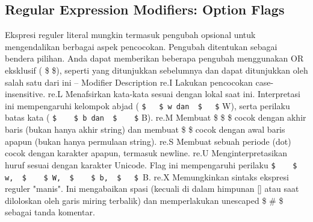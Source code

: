 \begin{enumerate}
\begin{enumerate}
\subsection{Regular Expression Modifiers: Option Flags}
Ekspresi reguler literal mungkin termasuk pengubah opsional untuk mengendalikan berbagai aspek pencocokan. Pengubah ditentukan sebagai bendera pilihan. Anda dapat memberikan beberapa pengubah menggunakan OR eksklusif ( \$   \$), seperti yang ditunjukkan sebelumnya dan dapat ditunjukkan oleh salah satu dari ini – Modifier Description
re.I
Lakukan pencocokan case-insensitive.
re.L
Menafsirkan kata-kata sesuai dengan lokal saat ini. Interpretasi ini mempengaruhi kelompok abjad ( \verb|$   $ w dan  $   $| W), serta perilaku batas kata ( \verb|$    $ b dan  $    $| B).
re.M
Membuat  \$  \$  \$ cocok dengan akhir baris (bukan hanya akhir string) dan membuat  \$   \$ cocok dengan awal baris apapun (bukan hanya permulaan string).
re.S
Membuat sebuah periode (dot) cocok dengan karakter apapun, termasuk newline.
re.U
Menginterpretasikan huruf sesuai dengan karakter Unicode. Flag ini mempengaruhi perilaku  \verb|$    $ w,  $    $ W,  $    $ b,  $   $ |B.
re.X
Memungkinkan sintaks ekspresi reguler "manis". Ini mengabaikan spasi (kecuali di dalam himpunan [] atau saat diloloskan oleh garis miring terbalik) dan memperlakukan unescaped  \$  \#  \$ sebagai tanda komentar.

\end{enumerate}
\end{enumerate}
